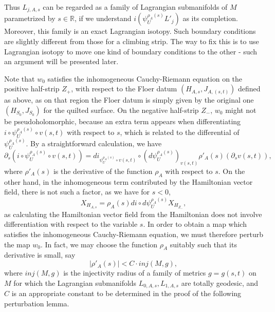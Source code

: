 \documentclass{amsart}
\numberwithin{equation}{section}
\numberwithin{figure}{section}
\begin{document}
Thus $L_{j, A, s}$ can be regarded as a family of Lagrangian submanifolds of $M$ parametrized by $s \in \mathbb{R}$, if we understand $i(\psi_{U}^{\rho_{A}(s)} L'_{j})$ as its completion. Moreover, this family is an exact Lagrangian isotopy.
Such boundary conditions are slightly different from those for a climbing strip. The way to fix this is to use Lagrangian isotopy to move one kind of boundary conditions to the other - such an argument will be presented later. \par
	Note that $w_{0}$ satisfies the inhomogeneous Cauchy-Riemann equation on the positive half-strip $Z_{+}$, with respect to the Floer datum $(H_{A, s}, J_{A, (s, t)})$ defined as above, as on that region the Floer datum is simply given by the original one $(H_{S_{0}}, J_{S_{0}})$ for the quilted surface. On the negative half-strip $Z_{-}$, $w_{0}$ might not be pseudoholomorphic, because an extra term appears when differentiating $i \circ \psi_{U}^{\rho_{A}(s)} \circ v(s, t)$ with respect to $s$, which is related to the differential of $\psi_{U}^{\rho_{A}(s)}$. By a straightforward calculation, we have
\begin{equation}
\partial_{s}(i \circ \psi_{U}^{\rho_{A}(s)} \circ v(s, t)) = di_{\psi_{U}^{\rho_{A}(s)} \circ v(s, t)} \circ (d\psi_{U}^{\rho_{A}(s)})_{v(s, t)} \rho'_{A}(s) (\partial_{s} v(s, t)),
\end{equation}
where $\rho'_{A}(s)$ is the derivative of the function $\rho_{A}$ with respect to $s$. On the other hand, in the inhomogeneous term contributed by the Hamiltonian vector field, there is not such a factor, as we have for $s < 0$,
\begin{equation}
X_{H_{A, s}} = \rho_{A}(s) di \circ d\psi_{U}^{\rho_{A}(s)} X_{H_{Z_{-}}},
\end{equation}
as calculating the Hamiltonian vector field from the Hamiltonian does not involve differentiation with respect to the variable $s$. In order to obtain a map which satisfies the inhomogeneous Cauchy-Riemann equation, we must therefore perturb the map $w_{0}$. In fact, we may choose the function $\rho_{A}$ suitably such that its derivative is small, say
\begin{equation*}
|\rho'_{A}(s)| < C \cdot inj(M, g),
\end{equation*}
where $inj(M, g)$ is the injectivity radius of a family of metrics $g = g(s, t)$ on $M$ for which the Lagrangian submanifolds $L_{0, A, s}, L_{1, A, s}$ are totally geodesic, and $C$ is an appropriate constant to be determined in the proof of the following perturbation lemma. \par
\end{document}
